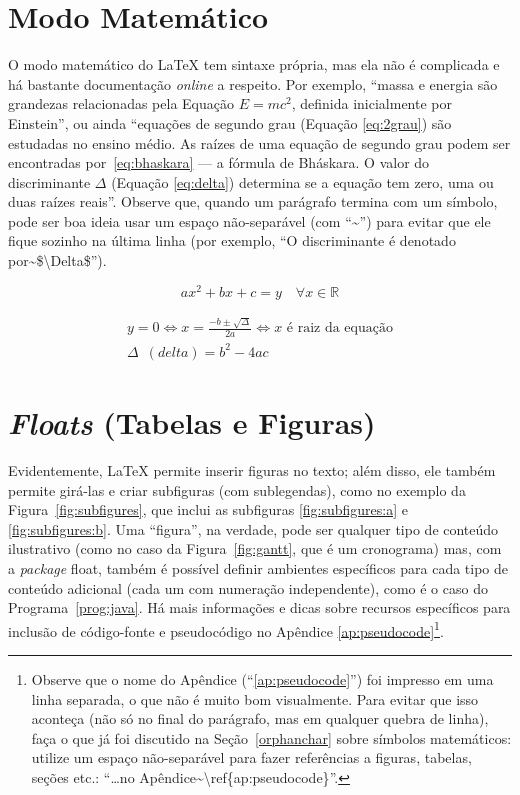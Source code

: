 \section{Modo Matemático}

O modo matemático do \LaTeX{} tem sintaxe própria, mas ela não é complicada e
há bastante documentação \emph{online} a respeito. Por exemplo, ``massa e
energia são grandezas relacionadas pela Equação $E=mc^2$, definida inicialmente
por Einstein'', ou ainda ``equações de segundo grau (Equação \ref{eq:2grau})
são estudadas no ensino médio. As raízes de uma equação de segundo grau podem
ser encontradas por~\eqref{eq:bhaskara} --- a fórmula de Bháskara.
O valor do discriminante $\Delta$ (Equação \ref{eq:delta}) determina se a
equação tem zero, uma ou duas raízes reais''. Observe que, quando um
parágrafo termina com um símbolo, pode ser boa ideia usar um espaço
não-separável (com ``\textsf{\textasciitilde}'') para evitar que ele
fique sozinho na última linha (por exemplo, ``\textsf{O discriminante é
denotado por\textasciitilde{}\$\textbackslash{}Delta\$}'').\label{orphanchar}

\begin{equation}
  \label{eq:2grau}
  ax^2+bx+c=y \quad \forall x \in \mathbb{R}
\end{equation}

\begin{gather}
  \label{eq:bhaskara}
    y=0 \Leftrightarrow x=\frac{-b \pm \sqrt{\Delta}}{2a}
    \Leftrightarrow x \text{ é raiz da equação}\\
  \label{eq:delta}
    \Delta\enspace(\mathit{delta}) = b^2-4ac
\end{gather}

\section{\emph{Floats} (Tabelas e Figuras)}

Evidentemente, \LaTeX{} permite inserir figuras no texto; além disso, ele
também permite girá-las e criar subfiguras (com sublegendas),
como no exemplo da Figura~\ref{fig:subfigures}, que inclui
as subfiguras \ref{fig:subfigures:a} e \ref{fig:subfigures:b}. Uma
``figura'', na verdade, pode ser qualquer tipo de conteúdo ilustrativo
(como no caso da Figura~\ref{fig:gantt}, que é um cronograma) mas, com a
\textit{package} \textsf{float}, também é possível definir ambientes
específicos para cada tipo de conteúdo adicional (cada um com numeração
independente), como é o caso do Programa~\ref{prog:java}. Há
mais informações e dicas sobre recursos específicos para inclusão de
código-fonte e pseudocódigo no Apêndice \ref{ap:pseudocode}\footnote{
Observe que o nome do Apêndice (``\ref{ap:pseudocode}'') foi impresso em
uma linha separada, o que não é muito bom visualmente. Para evitar que isso
aconteça (não só no final do parágrafo, mas em qualquer quebra de linha),
faça o que já foi discutido na Seção~\ref{orphanchar} sobre símbolos
matemáticos: utilize um espaço não-separável para fazer referências a
figuras, tabelas, seções etc.: ``\textsf{\dots no
Apêndice\textasciitilde\textbackslash{}ref\{ap:pseudocode\}}''.}.

